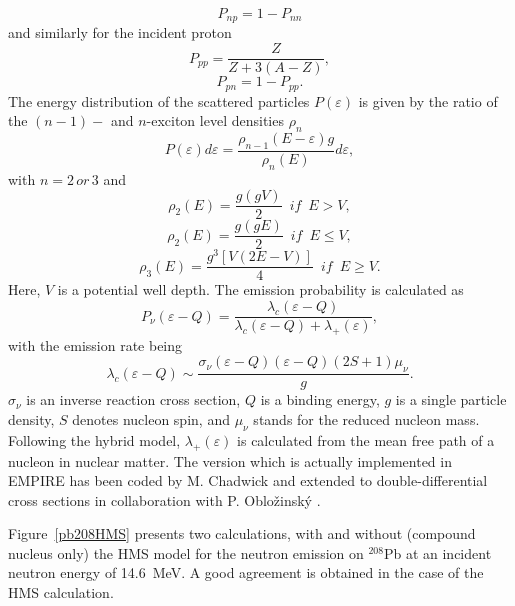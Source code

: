 \documentclass[twocolumn,amsmath,amssymb,10pt,groupedaddress,a4paper]{revtex4}
\begin{document}
\begin{equation}
P_{np}=1-P_{nn}\label{Pnp}\end{equation}
 and similarly for the incident proton
\begin{equation}
P_{pp}=\frac{Z}{Z+3(A-Z)},\label{Ppp}\end{equation}
\begin{equation}
P_{pn}=1-P_{pp}.\label{Ppn}\end{equation}
The energy distribution of the scattered particles $P(\varepsilon)$
is given by the ratio of the $(n-1)-$ and $n$-exciton level densities
$\rho_{n}$
\begin{equation}
P(\varepsilon)d\varepsilon=\frac{\rho_{n-1}(E-\varepsilon)g}{\rho_{n}(E)}d\varepsilon,\label{Penergy}\end{equation}
with $n=2\, or\,3$ and\begin{equation}
\rho_{2}(E)=\frac{g(gV)}{2}\,\,\, if\,\,\, E>V,\label{ro2u}\end{equation}
\begin{equation}
\rho_{2}(E)=\frac{g(gE)}{2}\,\,\, if\,\,\, E\leq V,\label{ro2d}\end{equation}
\begin{equation}
\rho_{3}(E)=\frac{g^{3}\left[V(2E-V)\right]}{4}\,\,\, if\,\,\, E\geq V.\label{ro3}\end{equation}
 Here, $V$ is a potential well depth. The emission probability is
calculated as
\begin{equation}
P_{\nu}(\varepsilon-Q)=\frac{\lambda_{c}(\varepsilon-Q)}{\lambda_{c}(\varepsilon-Q)+\lambda_{+}(\varepsilon)},\label{Pnu}\end{equation}
with the emission rate being
\begin{equation}
\lambda_{c}(\varepsilon-Q)\sim\frac{\sigma_{\nu}(\varepsilon-Q)(\varepsilon-Q)(2S+1)\mu_{\nu}}{g}.\label{lambdac}\end{equation}
$\sigma_{\nu}$ is an inverse reaction cross section, $Q$ is a binding
energy, $g$ is a single particle density, $S$ denotes nucleon spin,
and $\mu_{\nu}$ stands for the reduced nucleon mass. Following the
hybrid model, $\lambda_{+}(\varepsilon)$ is calculated
from the mean free path of a nucleon in nuclear matter.
The version which is actually implemented in EMPIRE has been coded
by M. Chadwick and extended to double-differential cross sections
in collaboration with P. Oblo\v zinsk\' y \cite{DDHMScode}.

Figure~\ref{pb208HMS} presents two calculations, with and without (compound nucleus only) the HMS model for the
neutron emission on $^{208}$Pb at an incident neutron energy of 14.6~MeV. A good agreement is obtained in the
case of the HMS calculation.
\end{document}
